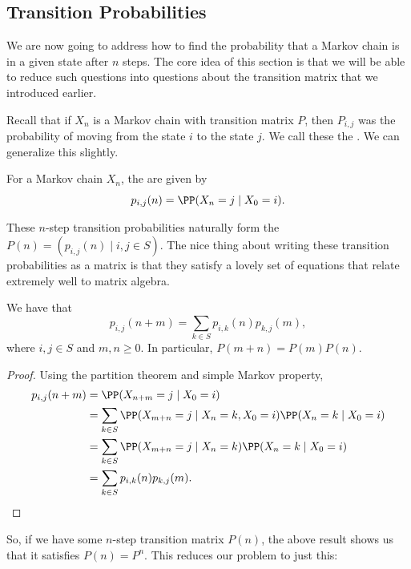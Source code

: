 \subsection{Transition Probabilities}

We are now going to address how to find the probability that a Markov chain is in a given state after $n$ steps.
The core idea of this section is that we will be able to reduce such questions into questions about the transition matrix that we introduced earlier.

Recall that if $X_n$ is a Markov chain with transition matrix $P$, then $P_{i, j}$ was the probability of moving from the state $i$ to the state $j$. We call these the . We can generalize this slightly.

\begin{definition}
	For a Markov chain $X_n$, the  are given by
	$$
	p_{i, j}(n) = \PP(X_n = j \mid X_0 = i).
	$$
\end{definition}

These $n$-step transition probabilities naturally form the  $P(n) = (p_{i, j}(n) \mid i, j \in S)$. The nice thing about writing these transition probabilities as a matrix is that they satisfy a lovely set of equations that relate extremely well to matrix algebra.

\begin{theorem}
	We have that
	$$
	p_{i, j}(n + m) = \sum_{k \in S} p_{i, k}(n)p_{k, j}(m),
	$$
	where $i, j \in S$ and $m, n \geq 0$. In particular, $P(m + n) = P(m)P(n)$.
\end{theorem}
\begin{proof}
	Using the partition theorem and simple Markov property,
	\begin{align*}
		p_{i, j}(n + m) &= \PP(X_{n + m} = j \mid X_0 = i) \\
		&= \sum_{k \in S} \PP(X_{m + n} = j \mid X_n = k, X_0 = i) \PP(X_n = k \mid X_0 = i) \\
		&= \sum_{k \in S} \PP(X_{m + n} = j \mid X_n = k) \PP(X_n = k \mid X_0 = i) \\
		&= \sum_{k \in S} p_{i, k}(n) p_{k, j}(m).
	\end{align*}
\end{proof}

So, if we have some $n$-step transition matrix $P(n)$, the above result shows us that it satisfies $P(n) = P^n$. This reduces our problem to just this:

